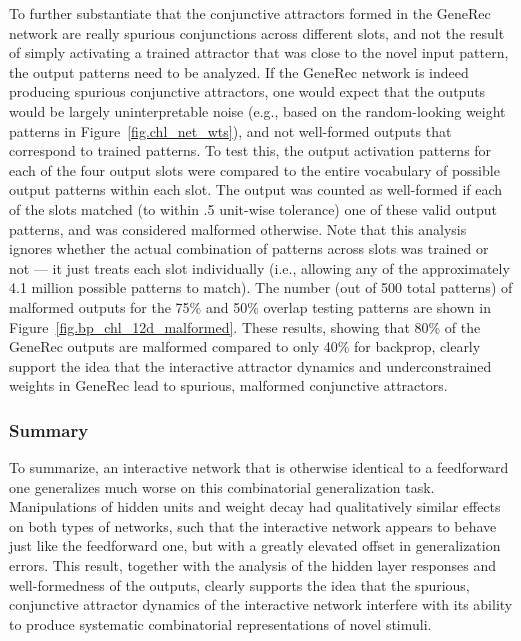 \documentclass[12pt,twoside]{article}
\begin{document}
To further substantiate that the conjunctive attractors formed in the
GeneRec network are really spurious conjunctions across different
slots, and not the result of simply activating a trained attractor
that was close to the novel input pattern, the output patterns need to
be analyzed.  If the GeneRec network is indeed producing spurious
conjunctive attractors, one would expect that the outputs would be
largely uninterpretable noise (e.g., based on the random-looking
weight patterns in Figure~\ref{fig.chl_net_wts}), and not well-formed
outputs that correspond to trained patterns.  To test this, the output
activation patterns for each of the four output slots were compared to
the entire vocabulary of possible output patterns within each slot.
The output was counted as well-formed if each of the slots matched (to
within .5 unit-wise tolerance) one of these valid output patterns, and
was considered malformed otherwise.  Note that this analysis ignores
whether the actual combination of patterns across slots was trained or
not --- it just treats each slot individually (i.e., allowing any of
the approximately 4.1 million possible patterns to match).  The number
(out of 500 total patterns) of malformed outputs for the 75\% and 50\%
overlap testing patterns are shown in
Figure~\ref{fig.bp_chl_12d_malformed}.  These results, showing that
80\% of the GeneRec outputs are malformed compared to only 40\% for
backprop, clearly support the idea that the interactive attractor
dynamics and underconstrained weights in GeneRec lead to spurious,
malformed conjunctive attractors.

\subsubsection{Summary}

To summarize, an interactive network that is otherwise identical to a
feedforward one generalizes much worse on this combinatorial
generalization task.  Manipulations of hidden units and weight decay
had qualitatively similar effects on both types of networks, such that
the interactive network appears to behave just like the feedforward
one, but with a greatly elevated offset in generalization errors.
This result, together with the analysis of the hidden layer responses
and well-formedness of the outputs, clearly supports the idea that the
spurious, conjunctive attractor dynamics of the interactive network
interfere with its ability to produce systematic combinatorial
representations of novel stimuli.
\end{document}
